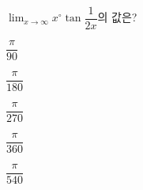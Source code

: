 $\displaystyle\lim_{x\to\infty}x^{\circ}\tan\dfrac{1}{2x}$의 값은?
\begin{choices32}{\rule[-3ex]{0pt}{8ex}$\dfrac{\pi}{90}$}{\rule[-3ex]{0pt}{8ex}$\dfrac{\pi}{180}$}{\rule[-3ex]{0pt}{8ex}$\dfrac{\pi}{270}$}{\rule[-3ex]{0pt}{8ex}$\dfrac{\pi}{360}$}{\rule[-3ex]{0pt}{8ex}$\dfrac{\pi}{540}$}\end{choices32}
